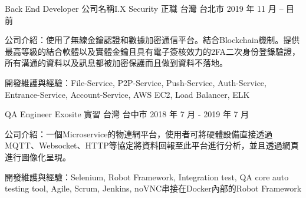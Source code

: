 

\begin{cventries}

  \cventry
    {Back End Developer} %
    {公司名稱I.X Security 正職} %
    {台灣 台北市} %
    {2019 年 11 月 – 目前} %
    {
      \begin{cvitems} %
        \item {公司介紹：使用了無線金鑰認證和數據加密通信平台。結合Blockchain機制。提供最高等級的結合軟體以及實體金鑰且具有電子簽核效力的2FA二次身份登錄驗證，所有溝通的資料以及訊息都被加密保護而且做到資料不落地。}
        \item {開發維護與經驗：File-Service, P2P-Service, Push-Service, Auth-Service, Entrance-Service, Account-Service, AWS EC2, Load Balancer, ELK}
      \end{cvitems}
    }

  \cventry
    {QA Engineer} %
    {Exosite 實習} %
    {台灣 台中市} %
    {2018 年 7 月 - 2019 年 7 月} %
    {
      \begin{cvitems} %
        \item {公司介紹：一個Microservice的物連網平台，使用者可將硬體設備直接透過MQTT、Websocket、HTTP等協定將資料回報至此平台進行分析，並且透過網頁進行圖像化呈現。}
        \item {開發維護與經驗：Selenium, Robot Framework, Integration test, QA core auto testing tool, Agile, Scrum, Jenkins, noVNC串接在Docker內部的Robot Framework}
      \end{cvitems}
    }

\end{cventries}
